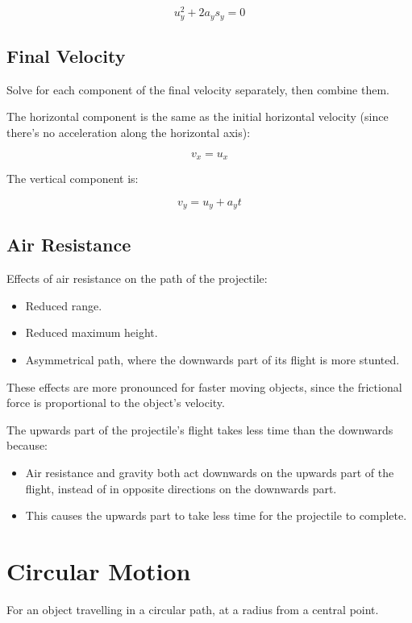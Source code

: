 \documentclass[a4paper,11pt]{article}
\begin{document}
$$
u_y^2 + 2 a_y s_y = 0
$$


\subsection{Final Velocity}

Solve for each component of the final velocity separately, then combine them.

The horizontal component is the same as the initial horizontal velocity (since
there's no acceleration along the horizontal axis):

$$
v_x = u_x
$$

The vertical component is:

$$
v_y = u_y + a_y t
$$


\subsection{Air Resistance}

Effects of air resistance on the path of the projectile:

\begin{itemize}
\item Reduced range.
\item Reduced maximum height.
\item Asymmetrical path, where the downwards part of its flight is more stunted.
\end{itemize}

These effects are more pronounced for faster moving objects, since the
frictional force is proportional to the object's velocity.

The upwards part of the projectile's flight takes less time than the downwards
because:

\begin{itemize}
\item Air resistance and gravity both act downwards on the upwards part of the
	flight, instead of in opposite directions on the downwards part.
\item This causes the upwards part to take less time for the projectile to
	complete.
\end{itemize}




\section{Circular Motion}

For an object travelling in a circular path, at a radius from a central point.
\end{document}
